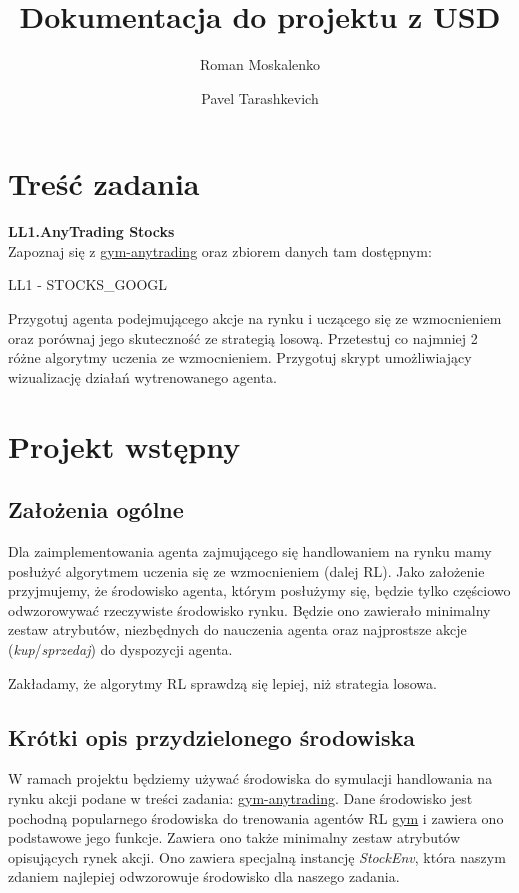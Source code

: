 \documentclass[12pt,a4paper]{article}
\title{Dokumentacja do projektu z USD}
\author{Roman Moskalenko \and Pavel Tarashkevich}
\date{}
\begin{document}
\maketitle

\section{Treść zadania}

\textbf{LL1.AnyTrading Stocks}\\

Zapoznaj się z \href{https://github.com/AminHP/gym-anytrading}{gym-anytrading} oraz
zbiorem danych tam dostępnym:

LL1 - STOCKS\_GOOGL

Przygotuj agenta podejmującego akcje na rynku i uczącego się ze wzmocnieniem
oraz porównaj jego skuteczność ze strategią losową. Przetestuj co najmniej 2 różne
algorytmy uczenia ze wzmocnieniem. Przygotuj skrypt umożliwiający wizualizację
działań wytrenowanego agenta.

\section{Projekt wstępny}

\subsection{Założenia ogólne}

Dla zaimplementowania agenta zajmującego się handlowaniem na rynku mamy
posłużyć algorytmem uczenia się ze wzmocnieniem (dalej RL). Jako założenie przyjmujemy,
że środowisko agenta, którym posłużymy się, będzie tylko częściowo odwzorowywać
rzeczywiste środowisko rynku. Będzie ono zawierało minimalny zestaw
atrybutów, niezbędnych do nauczenia agenta oraz najprostsze akcje
(\emph{kup}/\emph{sprzedaj}) do dyspozycji agenta.

Zakładamy, że algorytmy RL sprawdzą się lepiej, niż strategia losowa.

\subsection{Krótki opis przydzielonego środowiska}

W ramach projektu będziemy używać środowiska do symulacji handlowania
na rynku akcji podane w treści zadania: \href{https://github.com/AminHP/gym-anytrading}{gym-anytrading}.
Dane środowisko jest pochodną popularnego środowiska do trenowania agentów
RL \href{https://github.com/openai/gym}{gym} i zawiera ono podstawowe
jego funkcje. Zawiera ono także minimalny zestaw atrybutów opisujących
rynek akcji. Ono zawiera specjalną instancję \mbox{\emph{StockEnv}},
która naszym zdaniem najlepiej odwzorowuje środowisko dla naszego
zadania.
\end{document}
